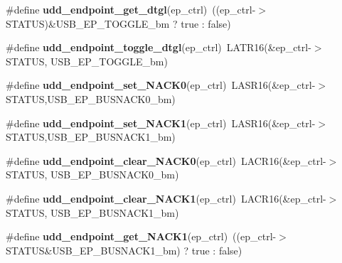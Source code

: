 \begin{DoxyCompactItemize}
\item 
\hypertarget{group__udd__xmega__usb__group_gaf1fb30ab493539973f723e150e23be1f}{\#define {\bfseries udd\-\_\-endpoint\-\_\-get\-\_\-dtgl}(ep\-\_\-ctrl)~((ep\-\_\-ctrl-\/$>$S\-T\-A\-T\-U\-S)\&U\-S\-B\-\_\-\-E\-P\-\_\-\-T\-O\-G\-G\-L\-E\-\_\-bm ? true \-: false)}\label{group__udd__xmega__usb__group_gaf1fb30ab493539973f723e150e23be1f}

\item 
\hypertarget{group__udd__xmega__usb__group_ga2c2e577006c61e2dc45d20501cfb59ac}{\#define {\bfseries udd\-\_\-endpoint\-\_\-toggle\-\_\-dtgl}(ep\-\_\-ctrl)~L\-A\-T\-R16(\&ep\-\_\-ctrl-\/$>$S\-T\-A\-T\-U\-S, U\-S\-B\-\_\-\-E\-P\-\_\-\-T\-O\-G\-G\-L\-E\-\_\-bm)}\label{group__udd__xmega__usb__group_ga2c2e577006c61e2dc45d20501cfb59ac}

\item 
\hypertarget{group__udd__xmega__usb__group_ga98a372156c53d61f5230f502eb42184b}{\#define {\bfseries udd\-\_\-endpoint\-\_\-set\-\_\-\-N\-A\-C\-K0}(ep\-\_\-ctrl)~L\-A\-S\-R16(\&ep\-\_\-ctrl-\/$>$S\-T\-A\-T\-U\-S,U\-S\-B\-\_\-\-E\-P\-\_\-\-B\-U\-S\-N\-A\-C\-K0\-\_\-bm)}\label{group__udd__xmega__usb__group_ga98a372156c53d61f5230f502eb42184b}

\item 
\hypertarget{group__udd__xmega__usb__group_ga80f29d5cea9942ea1a8657c5aa355482}{\#define {\bfseries udd\-\_\-endpoint\-\_\-set\-\_\-\-N\-A\-C\-K1}(ep\-\_\-ctrl)~L\-A\-S\-R16(\&ep\-\_\-ctrl-\/$>$S\-T\-A\-T\-U\-S,U\-S\-B\-\_\-\-E\-P\-\_\-\-B\-U\-S\-N\-A\-C\-K1\-\_\-bm)}\label{group__udd__xmega__usb__group_ga80f29d5cea9942ea1a8657c5aa355482}

\item 
\hypertarget{group__udd__xmega__usb__group_ga529ac89cc177be1dfef991c122bf9823}{\#define {\bfseries udd\-\_\-endpoint\-\_\-clear\-\_\-\-N\-A\-C\-K0}(ep\-\_\-ctrl)~L\-A\-C\-R16(\&ep\-\_\-ctrl-\/$>$S\-T\-A\-T\-U\-S, U\-S\-B\-\_\-\-E\-P\-\_\-\-B\-U\-S\-N\-A\-C\-K0\-\_\-bm)}\label{group__udd__xmega__usb__group_ga529ac89cc177be1dfef991c122bf9823}

\item 
\hypertarget{group__udd__xmega__usb__group_ga8a3a38dc00cbdff08d1cf685609a4d58}{\#define {\bfseries udd\-\_\-endpoint\-\_\-clear\-\_\-\-N\-A\-C\-K1}(ep\-\_\-ctrl)~L\-A\-C\-R16(\&ep\-\_\-ctrl-\/$>$S\-T\-A\-T\-U\-S, U\-S\-B\-\_\-\-E\-P\-\_\-\-B\-U\-S\-N\-A\-C\-K1\-\_\-bm)}\label{group__udd__xmega__usb__group_ga8a3a38dc00cbdff08d1cf685609a4d58}

\item 
\hypertarget{group__udd__xmega__usb__group_gafddf32b16d82e537f7e152d7ae6357df}{\#define {\bfseries udd\-\_\-endpoint\-\_\-get\-\_\-\-N\-A\-C\-K1}(ep\-\_\-ctrl)~((ep\-\_\-ctrl-\/$>$S\-T\-A\-T\-U\-S\&U\-S\-B\-\_\-\-E\-P\-\_\-\-B\-U\-S\-N\-A\-C\-K1\-\_\-bm) ? true \-: false)}\label{group__udd__xmega__usb__group_gafddf32b16d82e537f7e152d7ae6357df}


\end{DoxyCompactItemize}
